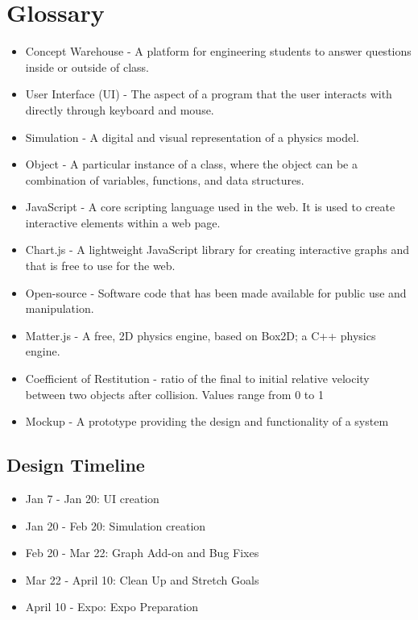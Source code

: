 \documentclass[onecolumn, draftclsnofoot,10pt, compsoc]{IEEEtran}
\begin{document}
\section{Glossary}
\begin{itemize}
  \item Concept Warehouse - A platform for engineering students to answer questions inside or outside of class.
  \item User Interface (UI) - The aspect of a program that the user interacts with directly through keyboard and mouse.
  \item Simulation - A digital and visual representation of a physics model.
  \item Object - A particular instance of a class, where the object can be a combination of variables, functions, and data structures.
  \item JavaScript - A core scripting language used in the web. It is used to create interactive elements within a web page.
  \item Chart.js - A lightweight JavaScript library for creating interactive graphs and that is free to use for the web.
  \item Open-source - Software code that has been made available for public use and manipulation.
  \item Matter.js - A free, 2D physics engine, based on Box2D; a C++ physics engine.
  \item Coefficient of Restitution - ratio of the final to initial relative velocity between two objects after collision. Values range from 0 to 1
  \item Mockup - A prototype providing the design and functionality of a system 
\end{itemize} 

\subsection{Design Timeline}
\begin{itemize}
    \item Jan 7 - Jan 20: UI creation
    \item Jan 20 - Feb 20: Simulation creation
    \item Feb 20 - Mar 22: Graph Add-on and Bug Fixes
    \item Mar 22 - April 10: Clean Up and Stretch Goals
    \item April 10 - Expo: Expo Preparation
\end{itemize}
\end{document}
